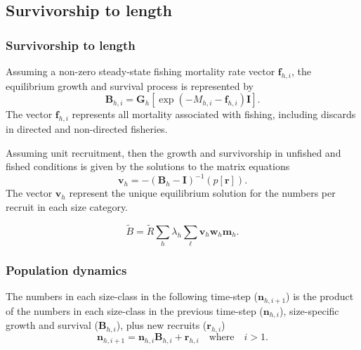 \documentclass{beamer}
\begin{document}
\subsection{Survivorship to length}
\begin{frame}
\frametitle{Survivorship to length}
Assuming a non-zero steady-state fishing mortality rate vector
$\boldsymbol{f}_{h,i}$, the equilibrium growth and survival process is
represented by
\begin{equation*}
  \boldsymbol{B}_{h,i} = \boldsymbol{G}_h \left[ \exp (-M_{h,i} -
    \boldsymbol{f}_{h,i}) \boldsymbol{I} \right].
\end{equation*}
The vector $\boldsymbol{f}_{h,i}$ represents all mortality associated with
fishing, including discards in directed and non-directed fisheries.

Assuming unit recruitment, then the growth and survivorship in unfished and
fished conditions is given by the solutions to the matrix equations
\begin{equation*}
  \boldsymbol{v}_h = -(\boldsymbol{B}_h - \boldsymbol{I})^{-1} (p[\boldsymbol{r}]).
\end{equation*}
The vector $\boldsymbol{v}_h$ represent the unique equilibrium solution for the
numbers per recruit in each size category.

\begin{equation*}
  \tilde{B} = \tilde{R} \sum_h \lambda_h \sum_\ell \boldsymbol{v}_h \boldsymbol{w}_{h}
  \boldsymbol{m}_{h}.
\end{equation*}
\end{frame}


\begin{frame}
\frametitle{Population dynamics}
The numbers in each size-class in the following time-step
($\boldsymbol{n}_{h,i+1}$) is the product of the numbers in each size-class in
the previous time-step ($\boldsymbol{n}_{h,i}$), size-specific growth and
survival ($\boldsymbol{B}_{h,i}$), plus new recruits ($\boldsymbol{r}_{h,i}$)
\begin{equation*}
  \boldsymbol{n}_{h,i+1} = \boldsymbol{n}_{h,i} \boldsymbol{B}_{h,i} +
  \boldsymbol{r}_{h,i} \quad \text{where} \quad i > 1.
\end{equation*}
\end{frame}

\end{document}
